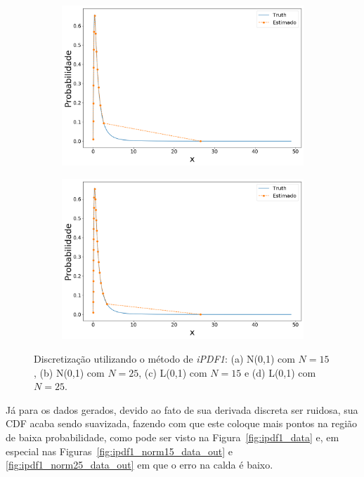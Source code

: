 \begin{figure}[H]
	\begin{subfigure}[b]{0.45\textwidth}
		\centering 
		\includegraphics[width=\linewidth]{./figuras/iPDF1_lognormal_15_1_0_0}
		\caption{}
		\label{fig:ipdflognorm15}
	\end{subfigure}
	\hfill
	\begin{subfigure}[b]{0.45\textwidth}
		\centering 
		\includegraphics[width=\linewidth]{./figuras/iPDF1_lognormal_25_1_0_0}
		\caption{}
		\label{fig:ipdflognorm25}
	\end{subfigure}
	
	\caption{Discretização utilizando o método de \textit{iPDF1}: (a) N(0,1) com $N = 15$, (b) N(0,1) com $N = 25$, (c) L(0,1) com $N = 15$ e (d) L(0,1) com $N = 25$.}
	\label{fig:ipdfmnorm}
\end{figure}

Já para os dados gerados, devido ao fato de sua derivada discreta ser ruidosa, sua CDF acaba sendo suavizada, fazendo com que este coloque mais pontos na região de baixa probabilidade, como pode ser visto na Figura~\ref{fig:ipdf1_data} e, em especial nas Figuras~\ref{fig:ipdf1_norm15_data_out} e \ref{fig:ipdf1_norm25_data_out} em que o erro na calda é baixo.

